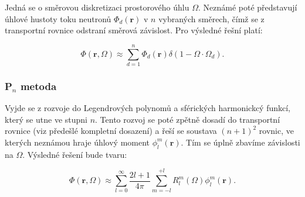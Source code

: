 Jedná se o směrovou diskretizaci prostorového úhlu $\Omega$. Neznámé poté představují úhlové hustoty toku neutronů $\Phi_d(\textbf{r})$ v $n$ vybraných směrech, čímž se z transportní rovnice odstraní směrová závislost. Pro výsledné řešní platí:

$$\Phi(\textbf{r}, \Omega) \approx \sum_{d=1}^{n} \Phi_d(\textbf{r}) \delta(1-\Omega \cdot \Omega_d).$$

\subsubsection{P$_n$ metoda}

Vyjde se z rozvoje do Legendrových polynomů a sférických harmonickcý funkcí, který se utne ve stupni $n$. Tento rozvoj se poté zpětně dosadí do transportní rovnice (viz předešlé kompletní dosazení) a řeší se soustava $(n+1)^2$ rovnic, ve kterých neznámou hraje úhlový moment $\phi_l^m(\textbf{r})$. Tím se úplně zbavíme závislosti na $\Omega$. Výsledné řešení bude tvaru:

$$\Phi(\textbf{r}, \Omega) \approx \sum_{l=0}^{\infty} \dfrac{2l + 1}{4 \pi} \sum_{m=-l}^{+l} R_l^m(\Omega)  \phi_l^m(\textbf{r}). $$